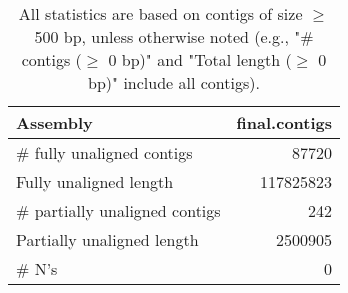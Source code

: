 \documentclass[12pt,a4paper]{article}
\begin{document}
\begin{table}[ht]
\begin{center}
\caption{All statistics are based on contigs of size $\geq$ 500 bp, unless otherwise noted (e.g., "\# contigs ($\geq$ 0 bp)" and "Total length ($\geq$ 0 bp)" include all contigs).}
\begin{tabular}{|l*{1}{|r}|}
\hline
Assembly & final.contigs \\ \hline
\# fully unaligned contigs & 87720 \\ \hline
Fully unaligned length & 117825823 \\ \hline
\# partially unaligned contigs & 242 \\ \hline
Partially unaligned length & 2500905 \\ \hline
\# N's & 0 \\ \hline
\end{tabular}
\end{center}
\end{table}
\end{document}
